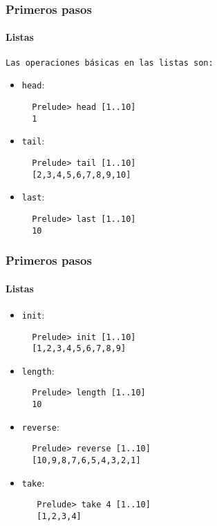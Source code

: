\begin{frame}[fragile]
  \frametitle{Primeros pasos}
  \framesubtitle{Listas}
  \texttt{Las operaciones básicas en las listas son:}
  \begin{itemize}
  \item \verb~head~:
    {\color{white}
      \begin{verbatim}
  Prelude> head [1..10]
  1
      \end{verbatim}
    }
  \item \verb~tail~:
    {\color{white}
      \begin{verbatim}
  Prelude> tail [1..10]
  [2,3,4,5,6,7,8,9,10]
    \end{verbatim}
    }
  \item \verb~last~:
    {\color{white}
      \begin{verbatim}
  Prelude> last [1..10]
  10
    \end{verbatim}
    }
  \end{itemize}
\end{frame}

\begin{frame}[fragile]
  \frametitle{Primeros pasos}
  \framesubtitle{Listas}
  \begin{itemize}
  \item \verb~init~:
    {\color{white}
      \begin{verbatim}
  Prelude> init [1..10]
  [1,2,3,4,5,6,7,8,9]
    \end{verbatim}
    }
  \item \verb~length~:
    {\color{white}
      \begin{verbatim}
  Prelude> length [1..10]
  10
    \end{verbatim}
    }
  \item \verb~reverse~:
    {\color{white}
      \begin{verbatim}
  Prelude> reverse [1..10]
  [10,9,8,7,6,5,4,3,2,1]
    \end{verbatim}
    }
  \item \verb~take~:
    {\color{white}
      \begin{verbatim}
   Prelude> take 4 [1..10]
   [1,2,3,4]
    \end{verbatim}
    }
  \end{itemize}
\end{frame}


